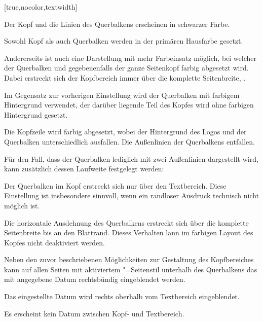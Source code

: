 \begin{Declaration*}{}
\begin{Declaration*}{}
\begin{Declaration*}{}
\begin{Declaration}[%
  v2.03;%
  v2.04!\Option{cdhead=barcolor}:nur farbig abgesetzter Querbalken;%
  v2.05!\Option{cdhead=date}:Datum zwischen Kopf- und Textbereich;%
]{}[true,nocolor,textwidth]
\begin{values}{}
  Der Kopf und die Linien des Querbalkens erscheinen in schwarzer Farbe.
\item[lightcolor/pale]
  Sowohl Kopf als auch Querbalken werden in der primären Hausfarbe gesetzt.
\end{values}
%
Andererseits ist auch eine Darstellung mit mehr Farbeinsatz möglich, bei 
welcher der Querbalken und gegebenenfalls der ganze Seitenkopf farbig 
abgesetzt wird. Dabei erstreckt sich der Kopfbereich immer über die komplette 
Seitenbreite, .
%
\begin{values}{}
\item[barcolor]
  Im Gegensatz zur vorherigen Einstellung wird der Querbalken mit farbigem 
  Hintergrund verwendet, der darüber liegende Teil des Kopfes wird ohne 
  farbigen Hintergrund gesetzt.
\item[bicolor/bichrome]
  Die Kopfzeile wird farbig abgesetzt, wobei der Hintergrund des Logos und der 
  Querbalken unterschiedlich ausfallen. Die Außenlinien der Querbalkens 
  entfallen.
\end{values}
%
Für den Fall, dass der Querbalken lediglich mit zwei Außenlinien dargestellt 
wird, kann zusätzlich dessen Laufweite festgelegt werden:
%
\begin{values}{}
\item[textwidth/slim]
  Der Querbalken im Kopf erstreckt sich nur über den Textbereich. Diese 
  Einstellung ist insbesondere sinnvoll, wenn ein randloser Ausdruck technisch 
  nicht möglich ist. 
\item[paperwidth/wide]
  Die horizontale Ausdehnung des Querbalkens erstreckt sich über die komplette 
  Seitenbreite bis an den Blattrand. Dieses Verhalten lann im farbigen Layout 
  des Kopfes nicht deaktiviert werden.
\end{values}
%
Neben den zuvor beschriebenen Möglichkeiten zur Gestaltung des Kopfbereiches 
kann auf allen Seiten mit aktiviertem "=Seitenstil 
unterhalb des Querbalkens das mit  angegebene Datum rechtsbündig 
eingeblendet werden.
%
\begin{values}{}
\item[date/showdate]
  Das eingestellte Datum wird rechts oberhalb vom Textbereich eingeblendet.
\item[nodate/hidedate]
  Es erscheint kein Datum zwischen Kopf- und Textbereich.
\end{values}
\end{Declaration}


\end{Declaration*}
\end{Declaration*}
\end{Declaration*}
